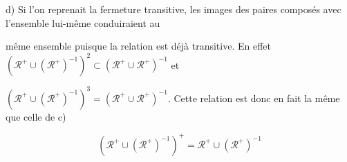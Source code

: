 \documentclass{article}
\begin{document}
\vspace{0.3cm}

d) Si l'on reprenait la fermeture transitive, les images des paires composés avec l'ensemble lui-même conduiraient au 

même ensemble puisque la relation est déjà transitive. En effet $(\mathcal{R}^{+} \cup (\mathcal{R}^{+})^{-1})^2 \subset (\mathcal{R}^{+} \cup \mathcal{R}^{+})^{-1}$ et 

$(\mathcal{R}^{+} \cup (\mathcal{R}^{+})^{-1})^3 = (\mathcal{R}^{+} \cup \mathcal{R}^{+})^{-1}$.  Cette relation est donc en fait la même que celle de c) 

$$(\mathcal{R}^{+} \cup (\mathcal{R}^{+})^{-1})^+ = \mathcal{R}^{+} \cup (\mathcal{R}^{+})^{-1}$$
\end{document}
